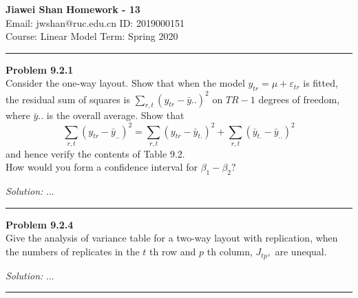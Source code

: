 \documentclass[a4paper, 11pt]{article}
\newenvironment{problem}[2][Problem]
    { \begin{mdframed}[backgroundcolor=gray!20] \textbf{#1 #2} \\}
    {  \end{mdframed}}
\newenvironment{solution}
    {\textit{Solution:}}
    {}
\begin{document}
\noindent
\large\textbf{Jiawei Shan} \hfill \textbf{Homework - 13}   \\
Email: jwshan@ruc.edu.cn \hfill ID: 2019000151 \\
\normalsize Course: Linear Model   \hfill Term: Spring 2020\\
\noindent\rule{7in}{2.8pt}
\begin{problem}{9.2.1}
  Consider the one-way layout. Show that when the model $y_{t r}=\mu+\varepsilon_{t r}$ is fitted, the residual sum of squares is $\sum_{r, t}\left(y_{t r}-\bar{y} . .\right)^{2}$ on $T R-1$ degrees of freedom, where $\bar{y}$.. is the overall average. Show that
  \[
  \sum_{r, t}\left(y_{t r}-\bar{y}_{. .}\right)^{2}=\sum_{r, t}\left(y_{t r}-\bar{y}_{t .}\right)^{2}+\sum_{r, t}\left(\bar{y}_{t .}-\bar{y}_{. .}\right)^{2}
  \]
  and hence verify the contents of Table 9.2.\\
 How would you form a confidence interval for $\beta_{1}-\beta_{2} ?$
\end{problem}
\begin{solution}
...
\end{solution}

\noindent\rule{7in}{2.8pt}

\begin{problem}{9.2.4}
Give the analysis of variance table for a two-way layout with replication, when the numbers of replicates in the $t$ th row and $p$ th column, $J_{t p},$ are unequal.
\end{problem}
\begin{solution}
...
\end{solution}

\noindent\rule{7in}{2.8pt}
\end{document}
